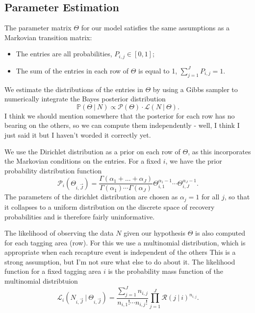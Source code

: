\documentclass[12pt]{article}
\newcommand{\sj}[1]{{\color{red}\mbox{}\marginpar{\raggedleft\hspace{0pt}*} #1}}
\newcommand{\vJ}{\vec{J}}
\newcommand{\cL}{\mathcal{L}}
\newcommand{\PP}{\mathbb{P}}
\newcommand{\cP}{\mathcal{P}}
\newcommand{\cR}{\mathcal{R}}
\begin{document}
\subsection{Parameter Estimation}
The parameter matrix $\Theta$ for our model satisfies the same assumptions as a Markovian transition matrix:
\begin{itemize}
  \item The entries are all probabilities, $P_{i,j} \in [0,1]$;
  \item The sum of the entries in each row of $\Theta$ is equal to 1, $\sum_{j=1}^J P_{i,j} = 1$.
\end{itemize}
We estimate the distributions of the entries in $\Theta$ by using a Gibbs sampler to numerically integrate the Bayes posterior distribution
\[
\PP(\Theta ~|~ N) \propto \cP(\Theta) \cdot \cL(N~|~\Theta).
\]
\sj{I think we should mention somewhere that the posterior for each row has no bearing on the others, so we can compute them independently - well, I think I just said it but I haven't worded it correctly yet.}

We use the Dirichlet distribution as a prior on each row of $\Theta$, as this incorporates the Markovian conditions on the entries. For a fixed $i$, we have the prior probability distribution function
\begin{equation}
\cP_i(\Theta_{i,\vJ}) = \frac{\Gamma(\alpha_1 + ... + \alpha_J)}{\Gamma(\alpha_1) \cdots\Gamma(\alpha_J)}\Theta_{i,1}^{\alpha_1 - 1} \cdots \Theta_{i,J}^{\alpha_J - 1}.
\end{equation}
The parameters of the dirichlet distribution are chosen as $\alpha_j = 1$ for all $j$, so that it collapses to a uniform distribution on the discrete space of recovery probabilities and is therefore fairly uninformative.

The likelihood of observing the data $N$ given our hypothesis $\Theta$ is also computed for each tagging area (row). For this we use a multinomial distribution, which is appropriate when each recapture event is independent of the others \sj{This is a strong assumption, but I'm not sure what else to do about it}. The likelihood function for a fixed tagging area $i$ is the probability mass function of the multinomial distribtuion
\begin{equation}
\cL_i(N_{i,\vJ} ~|~ \Theta_{i,\vJ}) = \frac{\sum_{j = 1}^J n_{i,j}}{n_{i,1}!\cdots n_{i,j}!}\prod_{j=1}^J \cR(j~|~i)^{n_{i,j}}.
\end{equation}
\end{document}
